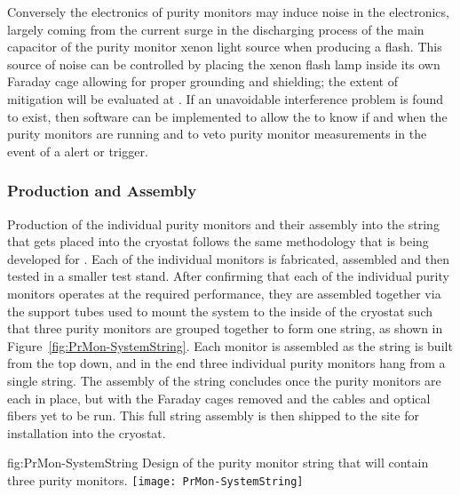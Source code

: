 Conversely the electronics of purity monitors may induce noise in the  electronics, largely coming from the current surge in the discharging process of the main capacitor of the purity monitor xenon light source when producing a flash.  This source of noise can be controlled by placing the xenon flash lamp inside its own Faraday cage allowing for proper grounding and shielding; the extent of mitigation will be evaluated at .
If an unavoidable interference problem is found to exist, then software can be implemented to allow the  to know if and when the purity monitors are running and to veto purity monitor measurements in the event of a  alert or trigger. 


\subsubsection{Production and Assembly}
\label{sec:PrMon-Production-Assembly}
Production of the individual purity monitors and their assembly into the string that gets placed into the  cryostat follows the same methodology that is being developed for .  Each of the individual monitors is fabricated, assembled and then tested in a smaller test stand.  After confirming that each of the individual purity monitors operates at the required performance, they are assembled together via the support tubes used to mount the system to the inside of the cryostat such that three purity monitors are grouped together to form one string, as shown in Figure~\ref{fig:PrMon-SystemString}.
Each monitor is assembled as the string is built from the top down, and in the end %
three individual purity monitors %
hang from a single string.  The assembly of the string concludes once the purity monitors are each in place, but with the Faraday cages removed and the  cables and optical fibers yet to be run.  This full string assembly is then %
shipped to the  site for installation into the cryostat.

\begin{dunefigure}{fig:PrMon-SystemString}
  {Design of the purity monitor string that will contain three purity monitors.}
  \texttt{[image: PrMon-SystemString]}
\end{dunefigure}




